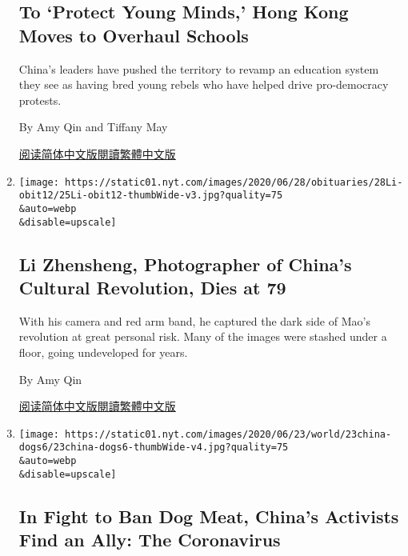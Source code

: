 \begin{enumerate}
  \hypertarget{to-protect-young-minds-hong-kong-moves-to-overhaul-schools}{%
  \subsection{To `Protect Young Minds,' Hong Kong Moves to Overhaul
  Schools}\label{to-protect-young-minds-hong-kong-moves-to-overhaul-schools}}

  China's leaders have pushed the territory to revamp an education
  system they see as having bred young rebels who have helped drive
  pro-democracy protests.

  By Amy Qin and Tiffany May

  \href{https://cn.nytimes.com/china/20200713/china-hong-kong-security-schools/}{阅读简体中文版}\href{https://cn.nytimes.com/china/20200713/china-hong-kong-security-schools/zh-hant/}{閱讀繁體中文版}
\item
  \href{/2020/06/25/world/asia/li-zhensheng-dead.html}{}

  \texttt{[image: https://static01.nyt.com/images/2020/06/28/obituaries/28Li-obit12/25Li-obit12-thumbWide-v3.jpg?quality=75\\\&auto=webp\\\&disable=upscale]}

  \hypertarget{li-zhensheng-photographer-of-chinas-cultural-revolution-dies-at-79}{%
  \subsection{Li Zhensheng, Photographer of China's Cultural Revolution,
  Dies at
  79}\label{li-zhensheng-photographer-of-chinas-cultural-revolution-dies-at-79}}

  With his camera and red arm band, he captured the dark side of Mao's
  revolution at great personal risk. Many of the images were stashed
  under a floor, going undeveloped for years.

  By Amy Qin

  \href{https://cn.nytimes.com/obits/20200629/li-zhensheng-dead/}{阅读简体中文版}\href{https://cn.nytimes.com/obits/20200629/li-zhensheng-dead/zh-hant/}{閱讀繁體中文版}
\item
  \href{/2020/06/23/world/asia/china-dog-meat.html}{}

  \texttt{[image: https://static01.nyt.com/images/2020/06/23/world/23china-dogs6/23china-dogs6-thumbWide-v4.jpg?quality=75\\\&auto=webp\\\&disable=upscale]}

  \hypertarget{in-fight-to-ban-dog-meat-chinas-activists-find-an-ally-the-coronavirus}{%
  \subsection{In Fight to Ban Dog Meat, China's Activists Find an Ally:
  The
  Coronavirus}\label{in-fight-to-ban-dog-meat-chinas-activists-find-an-ally-the-coronavirus}}


\end{enumerate}
